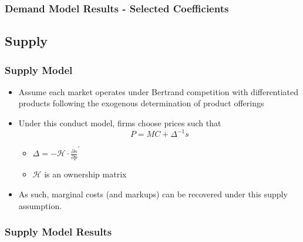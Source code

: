 \documentclass[xcolor=dvipsnames]{beamer}
\let\Oldsubsection\subsection
\renewcommand{\subsection}{\FloatBarrier\Oldsubsection}
\begin{document}
    \begin{frame}
        \frametitle{Demand Model Results - Selected Coefficients}
        \tiny
        \centering
        \begin{adjustbox}{max height=\dimexpr\textheight-5.5cm\relax,
           max width=\textwidth}

\end{adjustbox}
    \end{frame}
    
    \subsection{Supply}
    \begin{frame}
        \frametitle{Supply Model}
        \begin{itemize}
            \item Assume each market operates under Bertrand competition with differentiated products following the exogenous determination of product offerings
            \item Under this conduct model, firms choose prices such that  \vspace{-4mm} \[P = MC + \Delta^{-1} s\]
             \vspace{-8mm}
            \begin{itemize}
                \item  $\Delta = - \mathcal{H} \cdot \frac{\partial s}{\partial p}^{'}$
                \item $\mathcal{H}$ is an ownership matrix
            \end{itemize}
            \item As such, marginal costs (and markups) can be recovered under this supply assumption. 
        \end{itemize}
    \end{frame}

    \begin{frame}
        \frametitle{Supply Model Results}
                \tiny
        \centering
        \begin{adjustbox}{max height=\dimexpr\textheight-5.5cm\relax,
           max width=\textwidth}

\end{adjustbox}
    \end{frame}
\end{document}
